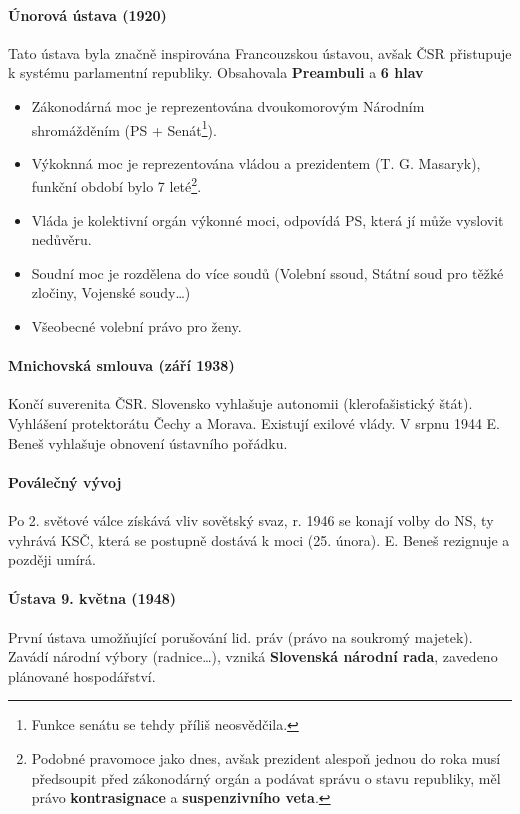 \documentclass[10pt,a4paper,
twoside,%
]{report}
\begin{document}
 \paragraph{Únorová ústava (1920)} Tato ústava byla značně inspirována Francouzskou ústavou, avšak ČSR přistupuje k systému parlamentní republiky.  Obsahovala \textbf{Preambuli} a \textbf{6 hlav}
 \begin{itemize}
 \item Zákonodárná moc je reprezentována dvoukomorovým Národním shromážděním (PS + Senát\footnote{Funkce senátu se tehdy příliš neosvědčila.}). 
 \item Výkoknná moc je reprezentována vládou a prezidentem (T. G. Masaryk), funkční období bylo 7 leté\footnote{Podobné pravomoce jako dnes, avšak prezident alespoň jednou do roka musí předsoupit před zákonodárný orgán a podávat správu o stavu republiky, měl právo \textbf{kontrasignace} a \textbf{suspenzivního veta}.}.
 \item Vláda je kolektivní orgán výkonné moci, odpovídá PS, která jí může vyslovit nedůvěru.
 \item Soudní moc je rozdělena do více soudů (Volební ssoud, Státní soud pro těžké zločiny, Vojenské soudy\dots)
 \item Všeobecné volební právo pro ženy.
 \end{itemize}

\paragraph{Mnichovská smlouva (září 1938)} Končí suverenita ČSR. Slovensko vyhlašuje autonomii (klerofašistický štát). Vyhlášení protektorátu Čechy a Morava. Existují exilové vlády. V srpnu 1944 E. Beneš vyhlašuje obnovení ústavního pořádku. 

\paragraph{Poválečný vývoj} Po 2. světové válce získává vliv sovětský svaz, r. 1946 se konají volby do NS, ty vyhrává KSČ, která se postupně dostává k moci (25. února). E. Beneš rezignuje a později umírá.

\paragraph{Ústava 9. května (1948)} První ústava umožňující porušování lid. práv (právo na soukromý majetek). Zavádí národní výbory (radnice\dots), vzniká \textbf{Slovenská národní rada}, zavedeno plánované hospodářství.
\end{document}
